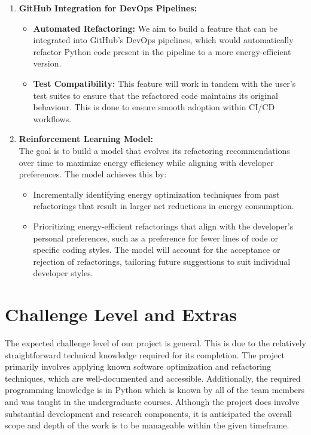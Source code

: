 \documentclass{article}
\begin{document}
\begin{enumerate}
  \item \textbf{GitHub Integration for DevOps Pipelines:}
    \begin{itemize}
      \item \textbf{Automated Refactoring:} We aim to build a feature
        that can be integrated into GitHub’s DevOps pipelines, which
        would automatically refactor Python code present in the
        pipeline to a more energy-efficient version.
      \item \textbf{Test Compatibility:} This feature will work in
        tandem with the user's test suites to ensure that the
        refactored code maintains its original behaviour. This is
        done to ensure smooth adoption within CI/CD workflows.
    \end{itemize}

  \item \textbf{Reinforcement Learning Model:} \\
    The goal is to build a model that evolves its refactoring
    recommendations over time to maximize energy efficiency while
    aligning with developer preferences. The model achieves this by:
    \begin{itemize}
      \item Incrementally identifying energy optimization techniques
        from past refactorings that result in larger net reductions
        in energy consumption.
      \item Prioritizing energy-efficient refactorings that align
        with the developer's personal preferences, such as a
        preference for fewer lines of code or specific coding styles.
        The model will account for the acceptance or rejection of
        refactorings, tailoring future suggestions to suit individual
        developer styles.
    \end{itemize}
\end{enumerate}

\section{Challenge Level and Extras}

The expected challenge level of our project is general. This is due to the
relatively straightforward technical knowledge required for its completion.
The project primarily involves applying known software optimization and
refactoring techniques, which are well-documented and accessible.
Additionally, the required programming knowledge is in Python which is known
by all of the team members and was taught in the undergraduate courses.
Although the project does involve substantial development and research components,
it is anticipated the overall scope and depth of the work is to be manageable within the
given timeframe. \\
\end{document}
